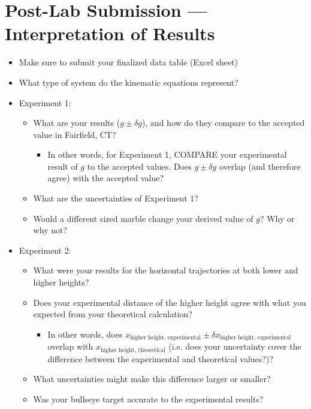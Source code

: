 \section{Post-Lab Submission --- Interpretation of Results}
\label{M3_InterpretationProjectile}
\begin{itemize}

\item Make sure to submit your finalized data table (Excel sheet)
\item What type of system do the kinematic equations represent?
\item Experiment 1:
\begin{itemize}
    \item What are your results ($g \pm \delta g$), and how do they compare to the accepted value in Fairfield, CT?
        \begin{itemize}
        \item In other words, for Experiment 1, COMPARE your experimental result of $g$ to the accepted values. Does $g \pm \delta g$ overlap (and therefore agree) with the accepted value?
        \end{itemize}
    \item What are the uncertainties of Experiment 1?
    \item Would a different sized marble change your derived value of $g$? Why or why not?
\end{itemize}
\item Experiment 2:
\begin{itemize}
    \item What were your results for the horizontal trajectories at both lower and higher heights?
    \item Does your experimental distance of the higher height agree with what you expected from your theoretical calculation?
    \begin{itemize}
        \item In other words, does $x_{\text{higher height, experimental}} \pm \delta x_{\text{higher height, experimental}}$ overlap with $x_{\text{higher height, theoretical}}$ (i.e. does your uncertainty cover the difference between the experimental and theoretical values?)?
    \end{itemize}
    \item What uncertainties might make this difference larger or smaller?
    \item Was your bullseye target accurate to the experimental results?
\end{itemize}

\end{itemize}
